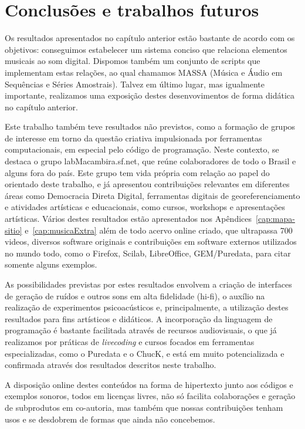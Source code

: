 \chapter{Conclusões e trabalhos futuros} %
\label{cap:conclusao}

Os resultados apresentados no capítulo anterior estão bastante de acordo
com os objetivos: conseguimos estabelecer um sistema conciso
que relaciona elementos musicais ao som digital. Dispomos também um conjunto
de scripts que implementam estas relações, ao qual chamamos MASSA (Música
e Áudio em Sequências e Séries Amostrais). Talvez em último lugar, mas igualmente
importante, realizamos uma exposição destes desenvovimentos de forma didática no
capítulo anterior.

Este trabalho também teve resultados não previstos, como a formação de grupos
de interesse em torno da questão criativa impulsionada por ferramentas computacionais,
em especial pelo código de programação. Neste contexto, se destaca o grupo
labMacambira.sf.net, que reúne colaboradores de todo o Brasil e alguns fora do país.
Este grupo tem vida própria com relação ao papel do orientado
deste trabalho, e já apresentou contribuições relevantes em diferentes áreas
como Democracia Direta Digital, ferramentas digitais de georeferenciamento e
atividades artísticas e educacionais, como cursos, workshops e apresentações artísticas. Vários destes resultados estão apresentados nos Apêndices~\ref{cap:mapa-sitio} e~\ref{cap:musicaExtra} além de todo acervo online criado, que ultrapassa 700 videos, diversos software originais e contribuições em software externos utilizados no mundo todo, como o Firefox, Scilab, LibreOffice, GEM/Puredata, para citar somente alguns exemplos.

As possibilidades previstas por estes resultados envolvem a criação de interfaces de geração de ruídos e outros sons em alta fidelidade (hi-fi), o auxílio na realização de experimentos psicoacústicos e, principalmente, a utilização destes resultados para fins artísticos e didáticos. A incorporação da linguagem de programação é bastante facilitada através de recursos audiovisuais, o que já realizamos por práticas de \emph{livecoding} e cursos focados em ferramentas especializadas, como o Puredata e o ChucK, e está em muito potencializada e confirmada através dos resultados descritos neste trabalho.

A disposição online destes conteúdos na forma de hipertexto junto aos códigos e exemplos sonoros, todos em licenças livres, não só facilita colaborações e geração de subprodutos em co-autoria, mas também que nossas contribuições tenham usos e se desdobrem de formas que ainda não concebemos.







